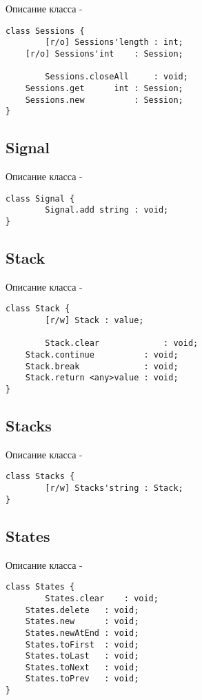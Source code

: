 \noindent Описание класса  -
\begin{lstlisting}[numbers=none]
class Sessions {
        [r/o] Sessions'length : int;
	[r/o] Sessions'int    : Session;
	
        Sessions.closeAll     : void;
	Sessions.get      int : Session;
	Sessions.new          : Session;
}
\end{lstlisting}

\subsection{{\color{orange} Signal}}

\noindent Описание класса  -
\begin{lstlisting}[numbers=none]
class Signal {
        Signal.add string : void;
}
\end{lstlisting}

\subsection{{\color{orange} Stack}}

\noindent Описание класса  -
\begin{lstlisting}[numbers=none]
class Stack {
        [r/w] Stack : value;
	
        Stack.clear             : void;
	Stack.continue          : void;
	Stack.break             : void;
	Stack.return <any>value : void;
}
\end{lstlisting}

\subsection{{\color{orange} Stacks}}

\noindent Описание класса  -
\begin{lstlisting}[numbers=none]
class Stacks {
        [r/w] Stacks'string : Stack;
}
\end{lstlisting}

\subsection{{\color{orange} States}}

\noindent Описание класса  -
\begin{lstlisting}[numbers=none]
class States {
        States.clear    : void;
	States.delete   : void;
	States.new      : void;
	States.newAtEnd : void;
	States.toFirst  : void;
	States.toLast   : void;
	States.toNext   : void;
	States.toPrev   : void;
}
\end{lstlisting}

